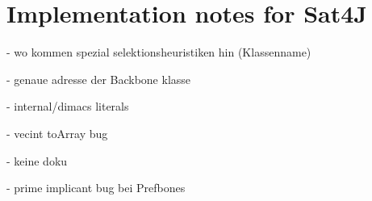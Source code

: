 \section{Implementation notes for Sat4J}


- wo kommen spezial selektionsheuristiken hin (Klassenname)

- genaue adresse der Backbone klasse

- internal/dimacs literals

- vecint toArray bug

- keine doku

- prime implicant bug bei Prefbones